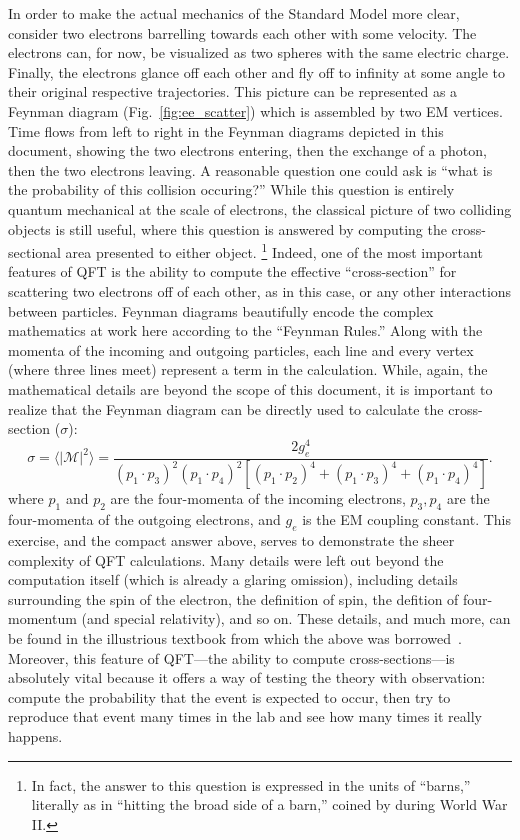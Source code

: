 In order to make the actual mechanics of the Standard Model more clear, consider two electrons barrelling towards each other with some velocity. 
The electrons can, for now, be visualized as two spheres with the same electric charge. 
Finally, the electrons glance off each other and fly off to infinity at some angle to their original respective trajectories. 
This picture can be represented as a Feynman diagram (Fig.~\ref{fig:ee_scatter}) which is assembled by two EM vertices. 
Time flows from left to right in the Feynman diagrams depicted in this document, showing the two electrons entering, then the exchange of a photon, then the two electrons leaving. 
A reasonable question one could ask is ``what is the probability of this collision occuring?''
While this question is entirely quantum mechanical at the scale of electrons, the classical picture of two colliding objects is still useful\footnotemark{}, where this question is answered by computing the cross-sectional area presented to either object. 
\footnote{In fact, the answer to this question is expressed in the units of ``barns,'' literally as in ``hitting the broad side of a barn,'' coined by during World War II.}
Indeed, one of the most important features of QFT is the ability to compute the effective ``cross-section'' for scattering two electrons off of each other, as in this case, or any other interactions between particles. 
Feynman diagrams beautifully encode the complex mathematics at work here according to the ``Feynman Rules.'' 
Along with the momenta of the incoming and outgoing particles, each line and every vertex (where three lines meet) represent a term in the calculation. 
While, again, the mathematical details are beyond the scope of this document, it is important to realize that the Feynman diagram can be directly used to calculate the cross-section ($\sigma$):
\begin{equation}
    \sigma = \langle|\mathcal{M}|^2\rangle = \frac{2g_e^4}{(p_1 \cdot p_3)^2(p_1 \cdot p_4)^2[(p_1 \cdot p_2)^4 + (p_1 \cdot p_3)^4 + (p_1 \cdot p_4)^4]}.
\end{equation}
where $p_1$ and $p_2$ are the four-momenta of the incoming electrons, $p_3, p_4$ are the four-momenta of the outgoing electrons, and $g_e$ is the EM coupling constant. 
This exercise, and the compact answer above, serves to demonstrate the sheer complexity of QFT calculations. 
Many details were left out beyond the computation itself (which is already a glaring omission), including details surrounding the spin of the electron, the definition of spin, the defition of four-momentum (and special relativity), and so on. 
These details, and much more, can be found in the illustrious textbook from which the above was borrowed~\cite{Griffiths}. 
Moreover, this feature of QFT---the ability to compute cross-sections---is absolutely vital because it offers a way of testing the theory with observation: compute the probability that the event is expected to occur, then try to reproduce that event many times in the lab and see how many times it really happens. 


